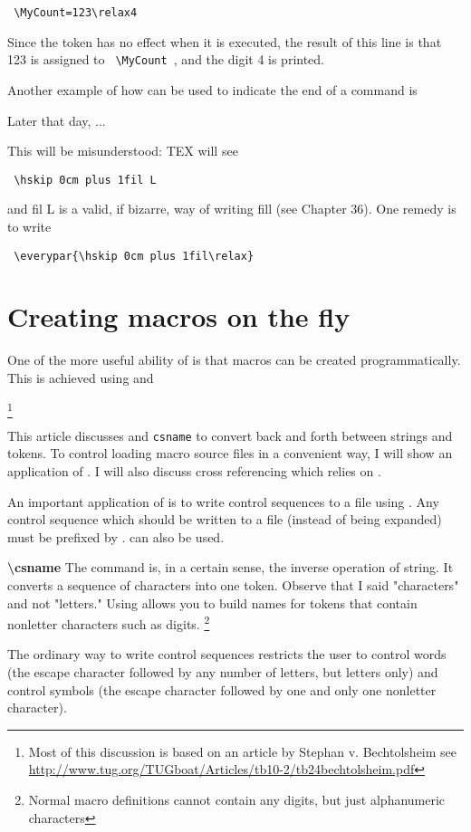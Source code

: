 \verb+ \MyCount=123\relax4+



\noindent Since the  token has no effect when it is executed, the result of this line is that 123 is
assigned to \verb+ \MyCount +, and the digit 4 is printed.

Another example of how  can be used to indicate the end of a command is


\begin{teX}
\indent Later that day, ...
\end{teX}

\noindent This will be misunderstood: TEX will see

\verb+ \hskip 0cm plus 1fil L+

\noindent and fil L is a valid, if bizarre, way of writing fill (see Chapter 36). One remedy is to write

\verb+ \everypar{\hskip 0cm plus 1fil\relax}+


\section*{Creating macros on the fly}

\begin{multicols}{2}
One of the more useful ability of \tex is that macros can be created programmatically. This is achieved using  and 

\footnote{Most of this discussion is based on an article by Stephan v. Bechtolsheim see \url{http://www.tug.org/TUGboat/Articles/tb10-2/tb24bechtolsheim.pdf}}

This article discusses  and \texttt{csname} to
convert back and forth between strings and tokens.
To control loading macro source files in a convenient
way, I will show an application of . I
will also discuss cross referencing which relies on
.


An important application of  is to
write control sequences to a file using .
Any control sequence which should be written
to a file (instead of being expanded) must be
prefixed by .  can also be
used.


\textbf{\textbackslash csname} The  command
is, in a certain sense, the inverse operation of
string. It converts a sequence of characters into
one token. Observe that I said "characters" and
not "letters." Using \texttt{\string\csname} allows you to build
names for tokens that contain { nonletter characters}
such as digits. \footnote{Normal macro definitions cannot contain any digits, but just alphanumeric characters}

The ordinary way to write control
sequences restricts the user to control words (the
escape character followed by any number of letters,
but letters only) and control symbols (the escape
character followed by one and only one nonletter
character).
\end{multicols}

